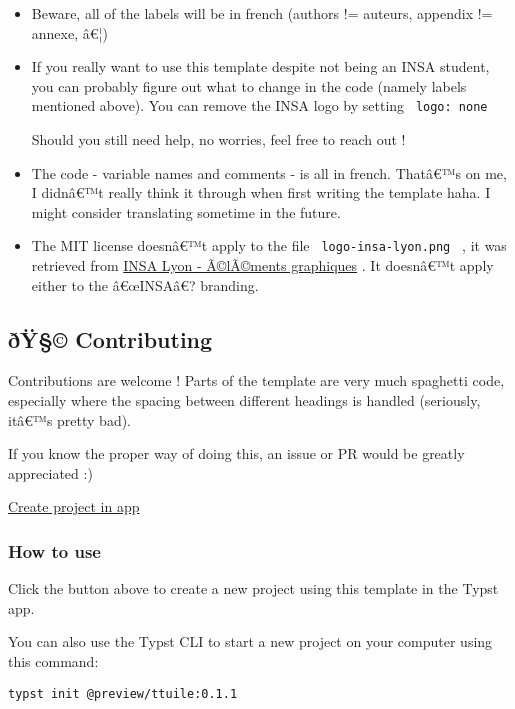 \begin{itemize}
\item
  Beware, all of the labels will be in french (authors != auteurs,
  appendix != annexe, â€¦)
\item
  If you really want to use this template despite not being an INSA
  student, you can probably figure out what to change in the code
  (namely labels mentioned above). You can remove the INSA logo by
  setting \texttt{\ logo:\ none\ }

  Should you still need help, no worries, feel free to reach out !
\item
  The code - variable names and comments - is all in french. Thatâ€™s on
  me, I didnâ€™t really think it through when first writing the template
  haha. I might consider translating sometime in the future.
\item
  The MIT license doesnâ€™t apply to the file
  \texttt{\ logo-insa-lyon.png\ } , it was retrieved from
  \href{https://www.insa-lyon.fr/fr/elements-graphiques}{INSA Lyon -
  Ã©lÃ©ments graphiques} . It doesnâ€™t apply either to the â€œINSAâ€?
  branding.
\end{itemize}

\subsection{ðŸ§© Contributing}\label{uxf0uxff-contributing}

Contributions are welcome ! Parts of the template are very much
spaghetti code, especially where the spacing between different headings
is handled (seriously, itâ€™s pretty bad).

If you know the proper way of doing this, an issue or PR would be
greatly appreciated :)

\href{/app?template=ttuile&version=0.1.1}{Create project in app}

\subsubsection{How to use}\label{how-to-use}

Click the button above to create a new project using this template in
the Typst app.

You can also use the Typst CLI to start a new project on your computer
using this command:

\begin{verbatim}
typst init @preview/ttuile:0.1.1
\end{verbatim}

